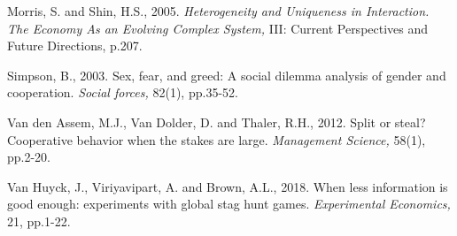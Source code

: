 \documentclass[12pt, letterpaper]{article}
\theoremstyle{plain}
\begin{document}
\begin{thebibliography}{10}



\bibitem{} Morris, S. and Shin, H.S., 2005. \textit{Heterogeneity and Uniqueness in Interaction. The Economy As an Evolving Complex System,} III: Current Perspectives and Future Directions, p.207.






\bibitem{} Simpson, B., 2003. Sex, fear, and greed: A social dilemma analysis of gender and cooperation. \textit{Social forces,} 82(1), pp.35-52.

\bibitem{} Van den Assem, M.J., Van Dolder, D. and Thaler, R.H., 2012. Split or steal? Cooperative behavior when the stakes are large. \textit{Management Science,} 58(1), pp.2-20.


\bibitem{} Van Huyck, J., Viriyavipart, A. and Brown, A.L., 2018. When less information is good enough: experiments with global stag hunt games. \textit{Experimental Economics,} 21, pp.1-22.



\end{thebibliography}
\end{document}
